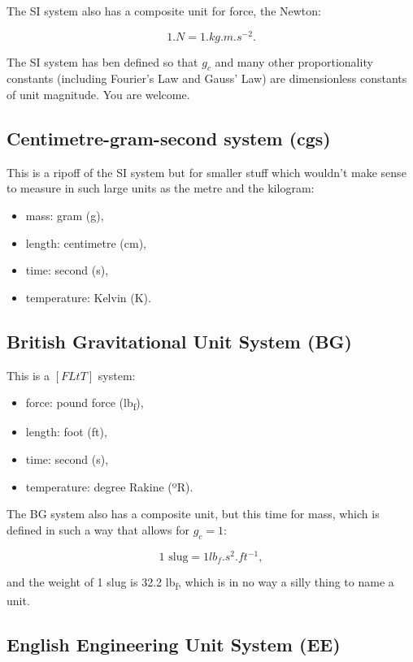 The SI system also has a composite unit for force, the Newton:

\begin{equation*}
  1 \si{.N} = 1 \si{.kg.m.s^{-2}}.
\end{equation*}

The SI system has ben defined so that $g_c$ and many other proportionality constants (including Fourier's Law and Gauss' Law) are dimensionless constants of unit magnitude. You are welcome.

\subsection*{Centimetre-gram-second system (cgs)}

This is a ripoff of the SI system but for smaller stuff which wouldn't make sense to measure in such large units as the metre and the kilogram:
\begin{itemize}
  \item mass: gram (g),
  \item length: centimetre (cm),
  \item time: second (s),
  \item temperature: Kelvin (K).
\end{itemize}

\subsection*{British Gravitational Unit System (BG)}

This is a $[FLtT]$ system:
\begin{itemize}
  \item force: pound force (\si{lb_f}),
  \item length: foot (ft),
  \item time: second (s),
  \item temperature: degree Rakine (ºR).
\end{itemize}

The BG system also has a composite unit, but this time for mass, which is defined in such a way that allows for $g_c=1$:

\begin{equation*}
  1 \text{ slug} = 1 \si{lb_f.s^2.ft^{-1}},
\end{equation*}

and the weight of 1 slug is 32.2 \si{lb_f}, which is in no way a silly thing to name a unit.

\subsection*{English Engineering Unit System (EE)}

